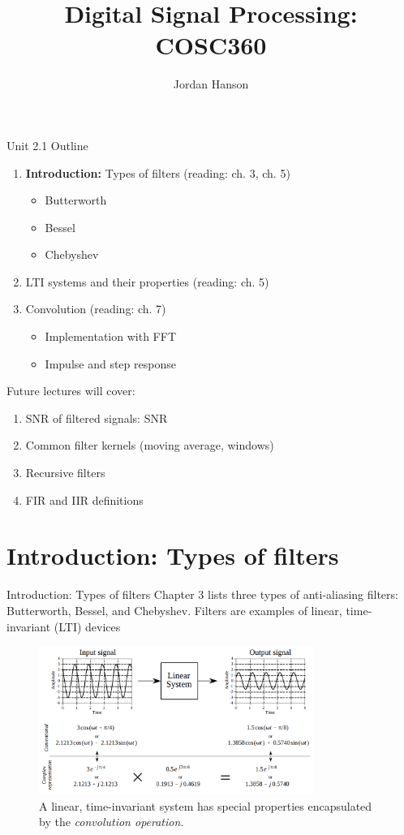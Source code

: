 \documentclass{beamer}
\title{Digital Signal Processing: COSC360}
\author{Jordan Hanson}
\institute{Whittier College Department of Physics and Astronomy}
\begin{document}
\maketitle

\begin{frame}{Unit 2.1 Outline}
\begin{enumerate}
\item \alert{\textbf{Introduction:} Types of filters} (reading: ch. 3, ch. 5)
\begin{itemize}
\item \alert{Butterworth}
\item \alert{Bessel}
\item \alert{Chebyshev}
\end{itemize}
\item \alert{LTI systems and their properties} (reading: ch. 5)
\item \alert{Convolution} (reading: ch. 7)
\begin{itemize}
\item \alert{Implementation with FFT}
\item \alert{Impulse and step response}
\end{itemize}
\end{enumerate}
Future lectures will cover:
\begin{enumerate}
\item SNR of filtered signals: SNR
\item Common filter kernels (moving average, windows)
\item Recursive filters
\item FIR and IIR definitions
\end{enumerate}
\end{frame}

\section{Introduction: Types of filters}

\begin{frame}{Introduction: Types of filters}
\small
Chapter 3 lists three types of anti-aliasing filters: Butterworth, Bessel, and Chebyshev.
Filters are examples of linear, time-invariant (LTI) devices
\begin{figure}
\centering
\includegraphics[width=0.8\textwidth]{figures/LTI1.png}
\caption{\label{fig:lti} A linear, time-invariant system has special properties encapsulated by the \textit{convolution operation.}}
\end{figure}
\end{frame}
\end{document}
